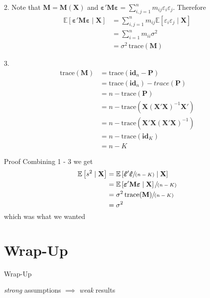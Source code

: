 \documentclass{beamer}
\begin{document}
\begin{frame}{2.}
\fontsize{15pt}{10}\selectfont
Note that $\mathbf{M} = \mathbf{M}(\mathbf{X})$ and 
$\bm{\varepsilon}'\mathbf{M}\bm{\varepsilon}
=\sum_{i,j=1}^n m_{ij} \varepsilon_i\varepsilon_j$. Therefore
\begin{align*}
\mathbb{E} \left[ \bm{\varepsilon}'\mathbf{M}\bm{\varepsilon} \mid \mathbf{X} \right]
&= \sum_{i,j=1}^n m_{ij}\mathbb{E}\left[ \varepsilon_i\varepsilon_j \mid \mathbf{X} \right]\\
&= \sum_{i=1}^n m_{ii}\sigma^2 \\
&= \sigma^2 \, \text{trace}(\mathbf{M})
\end{align*}
\end{frame}

\begin{frame}{3.}
\fontsize{15pt}{10}\selectfont
\begin{align*}
\text{trace}(\mathbf{M})
&= \text{trace}(\mathbf{id}_n-\bm{P}) \\
&= \text{trace}(\mathbf{id}_n)-trace(\bm{P}) \\ 
&= n-\text{trace}(\bm{P}) \\
&= n-\text{trace}(\mathbf{X}(\mathbf{X}'\mathbf{X})^{-1}\mathbf{X}') \\
&= n-\text{trace}(\mathbf{X}'\mathbf{X}(\mathbf{X}'\mathbf{X})^{-1}) \\
&= n-\text{trace}(\mathbf{id}_K) \\ 
&= n-K
\end{align*}
\end{frame}

\begin{frame}{Proof}
\fontsize{15pt}{10}\selectfont
Combining 1 - 3 we get 
\begin{align*}
    \mathbb{E} \left [ s^2 \mid \mathbf{X} \right] 
&= \mathbb{E} \left [ \bm{\hat{\varepsilon}}' \bm{\hat{\varepsilon}} \sfrac{}{(n-K)} \mid \mathbf{X} \right] \\
&=  \mathbb{E} \left [\bm{\varepsilon}'\mathbf{M} \bm{\varepsilon} \mid \mathbf{X} \right] \sfrac{}{(n-K)} \\
&= \sigma^2 \, \text{trace}(\mathbf{M}) \sfrac{}{(n-K)} \\
&= \sigma^2
\end{align*}
which was what we wanted
\end{frame}

\section{Wrap-Up}
\begin{frame}{Wrap-Up}
\fontsize{15pt}{10}\selectfont
\begin{center}
    \emph{strong} assumptions $\implies$ \emph{weak} results
\end{center}
\end{frame}
\end{document}
